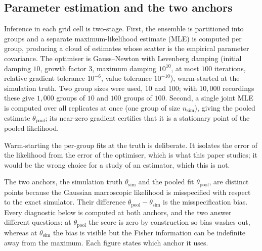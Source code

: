 \subsection*{Parameter estimation and the two anchors}

Inference in each grid cell is two-stage. First, the ensemble is partitioned into
groups and a separate maximum-likelihood estimate (MLE) is computed per group,
producing a cloud of estimates whose scatter is the empirical parameter covariance.
The optimiser is Gauss--Newton with Levenberg damping (initial damping $10$, growth
factor $3$, maximum damping $10^{10}$, at most $100$ iterations, relative gradient
tolerance $10^{-6}$, value tolerance $10^{-10}$), warm-started at the simulation
truth.
Two group sizes were used, $10$ and $100$; with $10{,}000$ recordings these give
$1{,}000$ groups of $10$ and $100$ groups of $100$.
Second, a single joint MLE is computed over all replicates at once (one group of
size $n_{\mathrm{sim}}$), giving the pooled estimate $\theta_{\mathrm{pool}}$; its
near-zero gradient certifies that it is a stationary point of the pooled likelihood.

Warm-starting the per-group fits at the truth is deliberate. It isolates the error
of the likelihood from the error of the optimiser, which is what this paper studies;
it would be the wrong choice for a study of an estimator, which this is not.

The two anchors, the simulation truth $\theta_{\mathrm{sim}}$ and the pooled fit
$\theta_{\mathrm{pool}}$, are distinct points because the Gaussian macroscopic
likelihood is misspecified with respect to the exact simulator. Their difference
$\theta_{\mathrm{pool}} - \theta_{\mathrm{sim}}$ is the misspecification bias. Every
diagnostic below is computed at both anchors, and the two answer different
questions: at $\theta_{\mathrm{pool}}$ the score is zero by construction so bias
washes out, whereas at $\theta_{\mathrm{sim}}$ the bias is visible but the Fisher
information can be indefinite away from the maximum. Each figure states which anchor
it uses.

